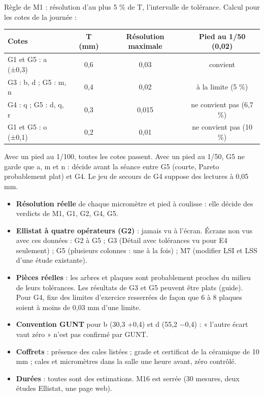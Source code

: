 \documentclass[10pt,a4paper]{article}
\begin{document}
Règle de M1 : résolution d'au plus 5 \% de T, l'intervalle de tolérance. Calcul pour les cotes de la journée :
\par\vspace{2pt}
\renewcommand{\arraystretch}{1.15}\footnotesize
\begin{tabularx}{\linewidth}{|>{\raggedright\arraybackslash}X|c|c|c|}\hline
\rowcolor{uimm}\color{white}\textbf{Cotes} & \color{white}\textbf{T (mm)} & \color{white}\textbf{Résolution maximale} & \color{white}\textbf{Pied au 1/50 (0,02)}\\\hline
G1 et G5 : a (±0,3) & 0,6 & 0,03 & convient\\ \hline
G3 : b, d ; G5 : m, n & 0,4 & 0,02 & à la limite (5 \%)\\ \hline
G4 : q ; G5 : d, q, r & 0,3 & 0,015 & ne convient pas (6,7 \%)\\ \hline
G1 et G5 : o (±0,1) & 0,2 & 0,01 & ne convient pas (10 \%)\\ \hline
\end{tabularx}
\par\smallskip
\normalsize
Avec un pied au 1/100, toutes les cotes passent. Avec un pied au 1/50, G5 ne garde que a, m et n : décide avant la séance entre G5 (courte, Pareto probablement plat) et G4. Le jeu de secours de G4 suppose des lectures à 0,05 mm.

\begin{itemize}[leftmargin=14pt,itemsep=1pt]\small
\item \textbf{Résolution réelle} de chaque micromètre et pied à coulisse : elle décide des verdicts de M1, G1, G2, G4, G5.
\item \textbf{Ellistat à quatre opérateurs (G2)} : jamais vu à l'écran. Écrans non vus avec ces données : G2 à G5 ; G3 (Détail avec tolérances vu pour E4 seulement) ; G5 (plusieurs colonnes : une à la fois) ; M7 (modifier LSI et LSS d'une étude existante).
\item \textbf{Pièces réelles} : les arbres et plaques sont probablement proches du milieu de leurs tolérances. Les résultats de G3 et G5 peuvent être plats (guide). Pour G4, fixe des limites d'exercice resserrées de façon que 6 à 8 plaques soient à moins de 0,03 mm d'une limite.
\item \textbf{Convention GUNT} pour b (30,3 +0,4) et d (55,2 −0,4) : « l'autre écart vaut zéro » n'est pas confirmé par GUNT.
\item \textbf{Coffrets} : présence des cales listées ; grade et certificat de la céramique de 10 mm ; cales et micromètres dans la salle une heure avant, zéro contrôlé.
\item \textbf{Durées} : toutes sont des estimations. M16 est serrée (30 mesures, deux études Ellistat, une page web).
\end{itemize}
\end{document}
